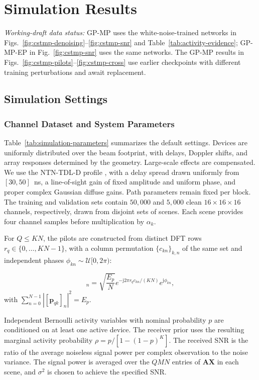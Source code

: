 \section{Simulation Results}
\label{sec:simulations}

\noindent\textit{Working-draft data status:}
GP-MP uses the white-noise-trained networks in
Figs.~\ref{fig:cstmp-denoising}--\ref{fig:cstmp-snr}
and Table~\ref{tab:activity-evidence}; GP-MP-EP in Fig.~\ref{fig:cstmp-snr}
uses the same networks. The GP-MP results in
Figs.~\ref{fig:cstmp-pilots}--\ref{fig:cstmp-cross} use earlier checkpoints
with different training perturbations and await replacement.

\subsection{Simulation Settings}
\label{sec:simulation-settings}

\subsubsection{Channel Dataset and System Parameters}
Table~\ref{tab:simulation-parameters} summarizes the default settings.
Devices are uniformly distributed over the beam footprint, with delays,
Doppler shifts, and array responses determined by the geometry.
Large-scale effects are compensated. We use the NTN-TDL-D profile
\cite{shen2025}, with a delay spread drawn uniformly from $[30,50]$~ns,
a line-of-sight gain of fixed amplitude and uniform phase, and proper
complex Gaussian diffuse gains. Path parameters remain fixed per block.
The training and validation sets contain $50{,}000$ and $5{,}000$ clean
$16\times16\times16$ channels, respectively, drawn from disjoint sets
of scenes. Each scene provides four channel samples before multiplication
by $\alpha_k$.

For $Q\leq KN$, the pilots are constructed from distinct DFT rows
$r_q\in\{0,\ldots,KN-1\}$, with a column permutation
$\{c_{kn}\}_{k,n}$ of the same set and independent phases
$\phi_{kn}\sim\mathcal U[0,2\pi)$:

\begin{equation}
 [\mathbf p_{qk}]_n=\sqrt{\frac{E_p}{N}}
 e^{-\mathrm j2\pi r_qc_{kn}/(KN)}e^{\mathrm j\phi_{kn}},
 \label{eq:pilot}
\end{equation}
with $\sum_{n=0}^{N-1}|[\mathbf p_{qk}]_n|^2=E_p$.

Independent Bernoulli activity variables with nominal probability $p$ are
conditioned on at least one active device. The receiver prior uses the
resulting marginal activity probability $\rho=p/[1-(1-p)^K]$.
The received SNR is the ratio of the average noiseless signal power per
complex observation to the noise variance. The signal power is averaged
over the $QMN$ entries of $\mathbf A\mathbf X$ in each scene, and
$\sigma^2$ is chosen to achieve the specified SNR.

